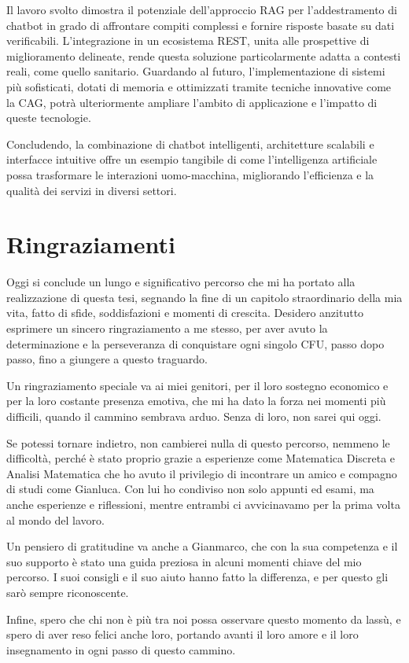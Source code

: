 \documentclass[a4paper,twoside,12pt]{toptesi}
\begin{document}
Il lavoro svolto dimostra il potenziale dell'approccio RAG per l'addestramento di chatbot in grado di affrontare compiti complessi e fornire risposte basate su dati verificabili. L'integrazione in un ecosistema REST, unita alle prospettive di miglioramento delineate, rende questa soluzione particolarmente adatta a contesti reali, come quello sanitario. Guardando al futuro, l'implementazione di sistemi più sofisticati, dotati di memoria e ottimizzati tramite tecniche innovative come la CAG, potrà ulteriormente ampliare l'ambito di applicazione e l'impatto di queste tecnologie.

Concludendo, la combinazione di chatbot intelligenti, architetture scalabili e interfacce intuitive offre un esempio tangibile di come l'intelligenza artificiale possa trasformare le interazioni uomo-macchina, migliorando l'efficienza e la qualità dei servizi in diversi settori.

\chapter*{Ringraziamenti}
Oggi si conclude un lungo e significativo percorso che mi ha portato alla realizzazione di questa tesi, segnando la fine di un capitolo straordinario della mia vita, fatto di sfide, soddisfazioni e momenti di crescita. Desidero anzitutto esprimere un sincero ringraziamento a me stesso, per aver avuto la determinazione e la perseveranza di conquistare ogni singolo CFU, passo dopo passo, fino a giungere a questo traguardo.

Un ringraziamento speciale va ai miei genitori, per il loro sostegno economico e per la loro costante presenza emotiva, che mi ha dato la forza nei momenti più difficili, quando il cammino sembrava arduo. Senza di loro, non sarei qui oggi.

Se potessi tornare indietro, non cambierei nulla di questo percorso, nemmeno le difficoltà, perché è stato proprio grazie a esperienze come Matematica Discreta e Analisi Matematica che ho avuto il privilegio di incontrare un amico e compagno di studi come Gianluca. Con lui ho condiviso non solo appunti ed esami, ma anche esperienze e riflessioni, mentre entrambi ci avvicinavamo per la prima volta al mondo del lavoro.

Un pensiero di gratitudine va anche a Gianmarco, che con la sua competenza e il suo supporto è stato una guida preziosa in alcuni momenti chiave del mio percorso. I suoi consigli e il suo aiuto hanno fatto la differenza, e per questo gli sarò sempre riconoscente.

Infine, spero che chi non è più tra noi possa osservare questo momento da lassù, e spero di aver reso felici anche loro, portando avanti il loro amore e il loro insegnamento in ogni passo di questo cammino.
\end{document}
